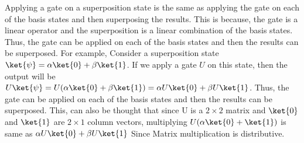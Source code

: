 \documentclass[12pt, oneside]{book}
\theoremstyle{definition}
\theoremstyle{definition}
\theoremstyle{remark}
\begin{document}
\begin{importantnote}
    Applying a gate on a superposition state is the same as applying the gate on each of the basis states and then superposing the results.
    This is because, the gate is a linear operator and the superposition is a linear combination of the basis states. 
    Thus, the gate can be applied on each of the basis states and then the results can be superposed. For example, Consider a superposition state $\ket{\psi}=\alpha\ket{0}+\beta\ket{1}$.
    If we apply a gate $U$ on this state, then the output will be $U\ket{\psi}=U(\alpha\ket{0}+\beta\ket{1})=\alpha U\ket{0}+\beta U\ket{1}$.
    Thus, the gate can be applied on each of the basis states and then the results can be superposed. This, can also be thought that since U is a $2 \times 2$ matrix and $\ket{0}$ and $\ket{1}$ are $2 \times 1$ column vectors, 
    multiplying $U(\alpha\ket{0}+\ket{1})$ is same as $\alpha U\ket{0}+\beta U\ket{1}$ Since Matrix multiplication is distributive. 


\end{importantnote}
\end{document}
